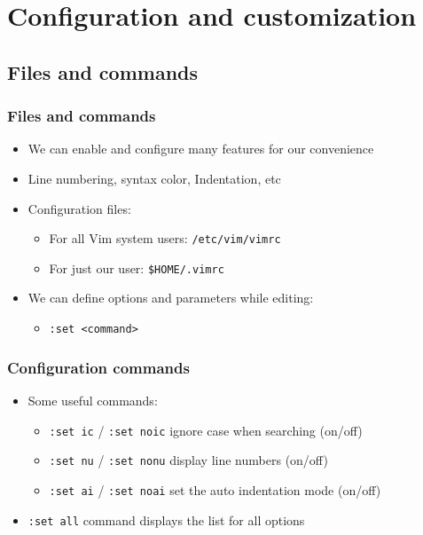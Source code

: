 \documentclass{beamer}
\begin{document}

\section{Configuration and customization}

\subsection{Files and commands}
\begin{frame}
\frametitle{Files and commands}

\begin{itemize}
\item We can enable and configure many features for our convenience
\item Line numbering, syntax color, Indentation, etc
\item Configuration files:
\begin{itemize}
\item For all Vim system users: \texttt{/etc/vim/vimrc}
\item For just our user: \texttt{\$HOME/.vimrc}
\end{itemize}
\item We can define options and parameters while editing:
\begin{itemize}
\item \texttt{:set <command>}
\end{itemize}

\end{itemize}

\end{frame}



\begin{frame}
\frametitle{Configuration commands}

\begin{itemize}
\item Some useful commands:
\begin{itemize}
\item \texttt{:set ic} / \texttt{:set noic} ignore case when searching (on/off)
\item \texttt{:set nu} / \texttt{:set nonu} display line numbers (on/off)
\item \texttt{:set ai} / \texttt{:set noai} set the auto indentation mode (on/off)
\end{itemize}
\item \texttt{:set all} command displays the list for all options
\end{itemize}

\end{frame}
\end{document}
